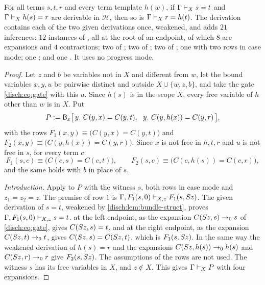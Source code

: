 \begin{theorem}
\label{disch:thm:bundle-transport}
For all terms $s,t,r$ and every term template $h(w)$, if
$\Gamma\vdash_Xs=t$ and $\Gamma\vdash_Xh(s)=r$ are derivable in
$\mathcal H$, then so is $\Gamma\vdash_Xr=h(t)$. The derivation contains
each of the two given derivations once, weakened, and adds $21$
inferences: $12$ instances of , all at the root of an
endpoint, of which $8$ are expansions and $4$ contractions; two of
; two of ; two of ; one
 with two rows in case mode; one ; and one
. It uses no progress mode.
\end{theorem}

\begin{proof}
Let $z$ and $b$ be variables not in $X$ and different from $w$, let the
bound variables $x,y,u$ be pairwise distinct and outside $X\cup\{w,z,b\}$,
and take the gate \eqref{disch:eq:gate} with this $u$. Since $h(s)$ is in
the scope $X$, every free variable of $h$ other than $w$ is in $X$. Put
\[
 P\defeq\mathsf B_x\bigl[\,y.\ C(y,x)=C(y,t),\ \ y.\ C(y,h(x))=C(y,r)\,\bigr],
\]
with the rows $F_1(x,y)\equiv\bigl(C(y,x)=C(y,t)\bigr)$ and
$F_2(x,y)\equiv\bigl(C(y,h(x))=C(y,r)\bigr)$. Since $x$ is not free in
$h,t,r$ and $u$ is not free in $s$, for every term $c$
\[
 F_1(s,c)\equiv\bigl(C(c,s)=C(c,t)\bigr),\qquad
 F_2(s,c)\equiv\bigl(C(c,h(s))=C(c,r)\bigr),
\]
and the same holds with $b$ in place of $s$.

\emph{Introduction.} Apply  to $P$ with the witness $s$, both
rows in case mode and $z_1=z_2=z$. The premise of row $1$ is
$\Gamma,F_1(s,0)\vdash_{X,z}F_1(s,S z)$. The given derivation of $s=t$,
weakened by \cref{disch:lem:bundle-struct}, proves
$\Gamma,F_1(s,0)\vdash_{X,z}s=t$.  at the left endpoint, as
the expansion $C(S z,s)\to_0s$ of \eqref{disch:eq:gate}, gives
$C(S z,s)=t$, and  at the right endpoint, as the expansion
$C(S z,t)\to_0t$, gives $C(S z,s)=C(S z,t)$, which is
$F_1(s,S z)$. In the same way the weakened derivation of $h(s)=r$ and the
expansions $C(S z,h(s))\to_0h(s)$ and $C(S z,r)\to_0r$ give
$F_2(s,S z)$. The assumptions of the rows are not used. The witness $s$
has its free variables in $X$, and $z\notin X$. This gives
$\Gamma\vdash_XP$ with four expansions.


\end{proof}
